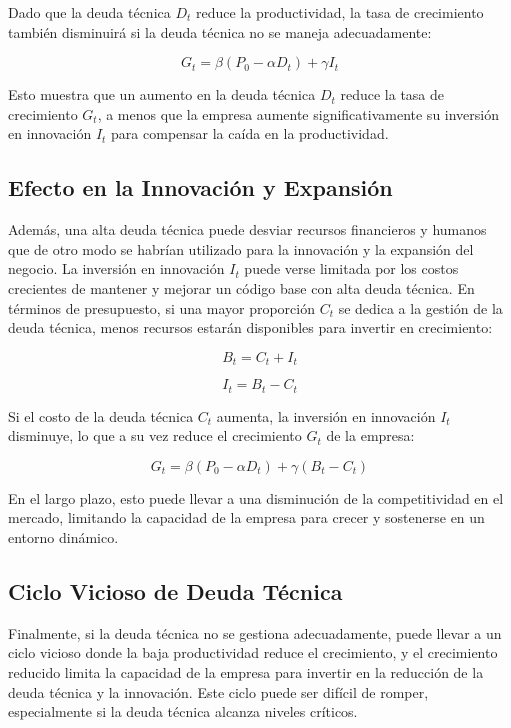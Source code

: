 \documentclass[12pt]{article}
\begin{document}
Dado que la deuda técnica \(D_t\) reduce la productividad, la tasa de crecimiento también disminuirá si la deuda técnica no se maneja adecuadamente:

\[
G_t = \beta (P_0 - \alpha D_t) + \gamma I_t
\]

Esto muestra que un aumento en la deuda técnica \(D_t\) reduce la tasa de crecimiento \(G_t\), a menos que la empresa aumente significativamente su inversión en innovación \(I_t\) para compensar la caída en la productividad.

\subsection{Efecto en la Innovación y Expansión}

Además, una alta deuda técnica puede desviar recursos financieros y humanos que de otro modo se habrían utilizado para la innovación y la expansión del negocio. La inversión en innovación \(I_t\) puede verse limitada por los costos crecientes de mantener y mejorar un código base con alta deuda técnica. En términos de presupuesto, si una mayor proporción \(C_t\) se dedica a la gestión de la deuda técnica, menos recursos estarán disponibles para invertir en crecimiento:

\[
B_t = C_t + I_t
\]

\[
I_t = B_t - C_t
\]

Si el costo de la deuda técnica \(C_t\) aumenta, la inversión en innovación \(I_t\) disminuye, lo que a su vez reduce el crecimiento \(G_t\) de la empresa:

\[
G_t = \beta (P_0 - \alpha D_t) + \gamma (B_t - C_t)
\]

En el largo plazo, esto puede llevar a una disminución de la competitividad en el mercado, limitando la capacidad de la empresa para crecer y sostenerse en un entorno dinámico.

\subsection{Ciclo Vicioso de Deuda Técnica}

Finalmente, si la deuda técnica no se gestiona adecuadamente, puede llevar a un ciclo vicioso donde la baja productividad reduce el crecimiento, y el crecimiento reducido limita la capacidad de la empresa para invertir en la reducción de la deuda técnica y la innovación. Este ciclo puede ser difícil de romper, especialmente si la deuda técnica alcanza niveles críticos.
\end{document}
